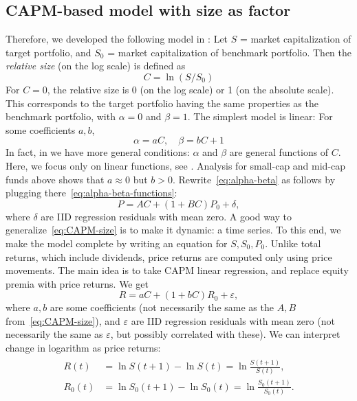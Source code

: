 \documentclass[12pt]{amsart}
\begin{document}
\subsection{CAPM-based model with size as factor} Therefore, we developed the following model in \cite{CAPM-size}: Let $S$ = market capitalization of target portfolio, and $S_0$ = market capitalization of benchmark portfolio. Then the {\it relative size} (on the log scale) is defined as 
\begin{equation}
\label{eq:relsize}
C = \ln(S/S_0)
\end{equation}
For $C = 0$, the relative size is 0 (on the log scale) or 1 (on the absolute scale). This corresponds to the target portfolio having the same properties as the benchmark portfolio, with $\alpha = 0$ and $\beta = 1$. The simplest model is linear: For some coefficients $a, b$,
\begin{equation}
\label{eq:alpha-beta-functions}
\alpha = aC, \quad \beta = bC + 1
\end{equation}
In fact, in \cite{CAPM-size} we have more general conditions: $\alpha$ and $\beta$ are general functions of $C$. Here, we focus only on linear functions, see \cite[Example 1]{CAPM-size}. Analysis for small-cap and mid-cap funds above shows that $a \approx 0$ but $b > 0$. Rewrite~\eqref{eq:alpha-beta} as follows by plugging there~\eqref{eq:alpha-beta-functions}:
\begin{equation}
\label{eq:CAPM-size}
P = AC + \left(1 + BC\right)P_0 + \delta,
\end{equation}
where $\delta$ are IID regression residuals with mean zero. A good way to generalize~\eqref{eq:CAPM-size} is to make it dynamic: a time series. To this end, we make the model complete by writing an equation for $S, S_0, P_0$. Unlike total returns, which include dividends, price returns are computed only using price movements. The main idea is to take CAPM linear regression, and replace equity premia with price returns. We get
\begin{equation}
\label{eq:returns-size}
R = aC + \left(1 + bC\right)R_0 + \varepsilon,
\end{equation}
where $a, b$ are some  coefficients (not necessarily the same as the $A, B$ from~\eqref{eq:CAPM-size}), and $\varepsilon$ are IID regression residuals with mean zero (not necessarily the same as $\varepsilon$, but possibly correlated with these). We can interpret change in logarithm as price returns: 
\begin{align}
\label{eq:d-ln}
\begin{split}
R(t) &= \ln S(t+1) - \ln S(t) = \ln\frac{S(t+1)}{S(t)},\\ 
R_0(t) &= \ln S_0(t+1) - \ln S_0(t) = \ln\frac{S_0(t+1)}{S_0(t)}.
\end{split}
\end{align}
\end{document}
